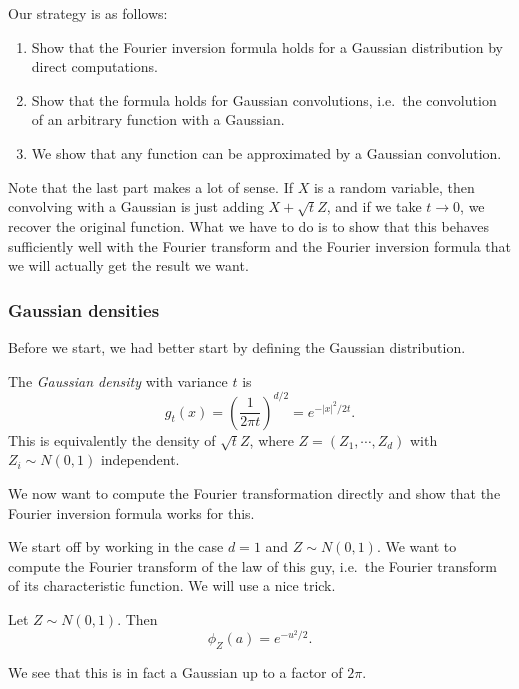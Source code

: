 \documentclass[a4paper]{article}
\begin{document}
Our strategy is as follows:
\begin{enumerate}
  \item Show that the Fourier inversion formula holds for a Gaussian distribution by direct computations.
  \item Show that the formula holds for Gaussian convolutions, i.e.\ the convolution of an arbitrary function with a Gaussian.
  \item We show that any function can be approximated by a Gaussian convolution.
\end{enumerate}
Note that the last part makes a lot of sense. If $X$ is a random variable, then convolving with a Gaussian is just adding $X + \sqrt{t}Z$, and if we take $t \to 0$, we recover the original function. What we have to do is to show that this behaves sufficiently well with the Fourier transform and the Fourier inversion formula that we will actually get the result we want.

\subsubsection*{Gaussian densities}
Before we start, we had better start by defining the Gaussian distribution.
\begin{defi}
  The \emph{Gaussian density} with variance $t$ is
  \[
    g_t(x) = \left(\frac{1}{2\pi t}\right)^{d/2} = e^{-|x|^2/2t}.
  \]
  This is equivalently the density of $\sqrt{t} Z$, where $Z = (Z_1, \cdots, Z_d)$ with $Z_i \sim N(0, 1)$ independent.
\end{defi}

We now want to compute the Fourier transformation directly and show that the Fourier inversion formula works for this.

We start off by working in the case $d = 1$ and $Z \sim N(0, 1)$. We want to compute the Fourier transform of the law of this guy, i.e.\ the Fourier transform of its characteristic function. We will use a nice trick.

\begin{prop}
  Let $Z \sim N(0, 1)$. Then
  \[
    \phi_Z(a) = e^{-u^2/2}.
  \]
\end{prop}
We see that this is in fact a Gaussian up to a factor of $2\pi$.
\end{document}
